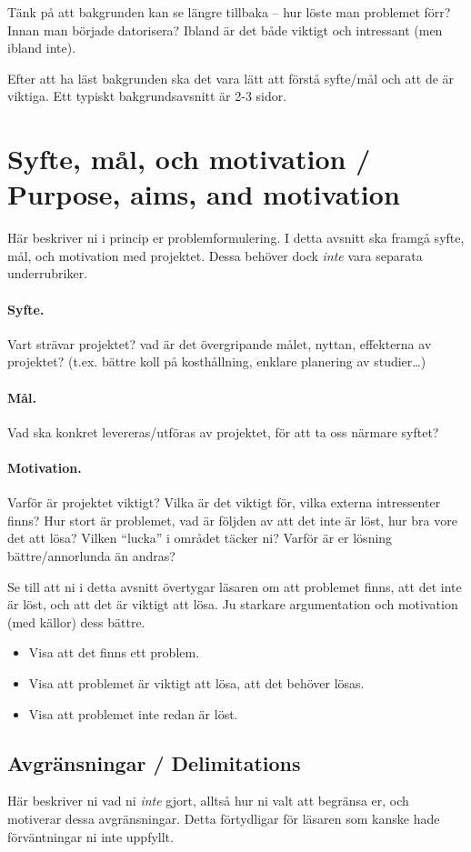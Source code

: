 \documentclass[a4paper,12pt]{article}
\begin{document}
Tänk på att bakgrunden kan se längre tillbaka -- hur löste man problemet förr? Innan man började datorisera? Ibland är det både viktigt och intressant (men ibland inte).

Efter att ha läst bakgrunden ska det vara lätt att förstå syfte/mål och att de är viktiga. Ett typiskt bakgrundsavsnitt är 2-3 sidor.

\section{Syfte, mål, och motivation / Purpose, aims, and motivation}\label{sec:syfte}
Här beskriver ni i princip er problemformulering.  I detta avsnitt ska framgå syfte, mål, och motivation med projektet. 
Dessa behöver dock \emph{inte} vara separata underrubriker.

\paragraph{Syfte.} Vart strävar projektet? vad är det övergripande målet, nyttan, effekterna av projektet?  (t.ex. bättre koll på kosthållning, enklare planering av studier\ldots)
\paragraph{Mål.} Vad ska konkret levereras/utföras av projektet, för att ta oss närmare syftet?
\paragraph{Motivation.}  Varför är projektet viktigt?  Vilka är det viktigt för, vilka externa intressenter finns?  Hur stort är problemet, vad är följden av att det inte är löst, hur bra vore det att lösa?  Vilken ``lucka'' i området täcker ni?
Varför är er lösning bättre/annorlunda än andras?

Se till att ni i detta avsnitt övertygar läsaren om att problemet finns, att det inte är löst, och att det är viktigt att lösa. Ju starkare argumentation och motivation (med källor) dess bättre.
\begin{itemize}
\item Visa att det finns ett problem.
\item Visa att problemet är viktigt att lösa, att det behöver lösas.
\item Visa att problemet inte redan är löst.
\end{itemize}

\subsection{Avgränsningar / Delimitations}
Här beskriver ni vad ni \emph{inte} gjort, alltså hur ni valt att begränsa er, och motiverar dessa avgränsningar. Detta förtydligar för läsaren som kanske hade förväntningar ni inte uppfyllt.
\end{document}
